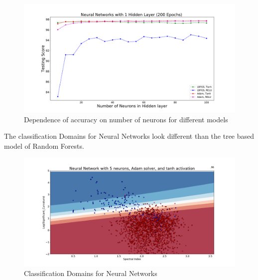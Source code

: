 \begin{figure}[h]
\includegraphics[width=\twopicsp\textwidth]{plots/neurons3.pdf}
\caption{Dependence of accuracy on number of neurons for different models}
\label{fig:Maps_data}
\end{figure}

The classification Domains for Neural Networks look different than the tree based model of Random Forests.\\
\begin{figure}[h]
\includegraphics[width=\twopicsp\textwidth]{plots/classdom_nn_200_adam_tanh_5.pdf}
\caption{Classification Domains for Neural Networks}
\label{fig:Maps_data}
\end{figure}

